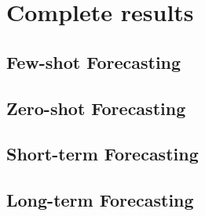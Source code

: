 \section{Complete results}

\subsection{Few-shot Forecasting}
\label{appx:few-shot}



\subsection{Zero-shot Forecasting}
\label{appx:zero-shot}


\subsection{Short-term Forecasting}
\label{appx:short-term}


\subsection{Long-term Forecasting}
\label{appx:long-term}

